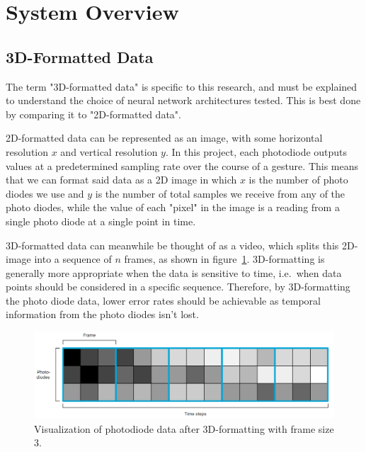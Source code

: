 \section{System Overview}\label{sec:system-overview}
\subsection{3D-Formatted Data}\label{subsec:3d-formatted-data}
The term "3D-formatted data" is specific to this research, and must be explained to understand the choice of neural network architectures tested.
This is best done by comparing it to "2D-formatted data".

2D-formatted data can be represented as an image, with some horizontal resolution $x$ and vertical resolution $y$.
In this project, each photodiode outputs values at a predetermined sampling rate over the course of a gesture.
This means that we can format said data as a 2D image in which $x$ is the number of photo diodes we use and $y$ is the number of total samples we receive from any of the photo diodes, while the value of each "pixel" in the image is a reading from a single photo diode at a single point in time.

3D-formatted data can meanwhile be thought of as a video, which splits this 2D-image into a sequence of $n$ frames, as shown in figure~\ref{fig:3d-data}\@.
3D-formatting is generally more appropriate when the data is sensitive to time, i.e.\ when data points should be considered in a specific sequence.
Therefore, by 3D-formatting the photo diode data, lower error rates should be achievable as temporal information from the photo diodes isn't lost.

\begin{figure}[h]
    \centering
    \captionsetup{justification=centering}
    \includegraphics[width=\linewidth]{figures/3d_data}
    \caption{Visualization of photodiode data after 3D-formatting with frame size 3.}
    \label{fig:3d-data}
\end{figure}

